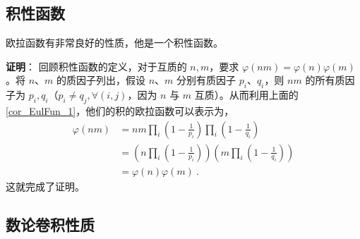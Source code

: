 \subsection{积性函数}
\begin{theorem}{}
欧拉函数有非常良好的性质，他是一个积性函数。
\end{theorem}
\textbf{证明}：
回顾积性函数的定义，对于互质的 $n, m$，要求 $\varphi(n m ) = \varphi(n) \varphi(m)$。将 $n$、$m$ 的质因子列出，假设 $n$、$m$ 分别有质因子 $p_i$、$q_i$，则 $nm$ 的所有质因子为 $p_i, q_i$（$p_i \neq q_j, \forall (i, j)$，因为 $n$ 与 $m$ 互质）。从而利用上面的\autoref{cor_EulFun_1}，他们的积的欧拉函数可以表示为，
\begin{equation}
\begin{aligned}
\varphi(n m) &= nm \prod_i \left(1-\frac1{p_i}\right) \prod_i \left(1-\frac1{q_i}\right)\\
&= \left(n \prod_i \left(1 - \frac1{p_i}\right)\right) \left(m \prod_i \left(1 - \frac1{q_i}\right)\right)\\
&= \varphi(n) \varphi(m) ~.
\end{aligned}
\end{equation}
这就完成了证明。

\subsection{数论卷积性质}
